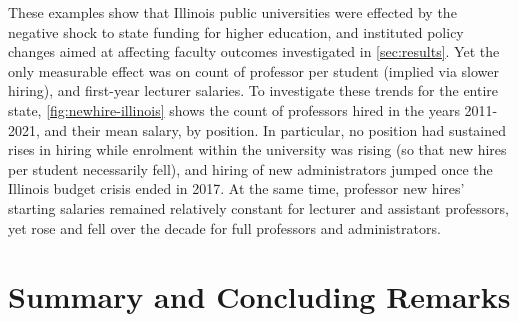 \documentclass[notitlepage,12pt]{article}
\begin{document}
These examples show that Illinois public universities were effected by the negative shock to state funding for higher education, and instituted policy changes aimed at affecting faculty outcomes investigated in \autoref{sec:results}.
Yet the only measurable effect was on count of professor per student (implied via slower hiring), and first-year lecturer salaries.
To investigate these trends for the entire state, \autoref{fig:newhire-illinois} shows the count of professors hired in the years 2011-2021, and their mean salary, by position.
In particular, no position had sustained rises in hiring while enrolment within the university was rising (so that new hires per student necessarily fell), and hiring of new administrators jumped once the Illinois budget crisis ended in 2017.
At the same time, professor new hires' starting salaries remained relatively constant for lecturer and assistant professors, yet rose and fell over the decade for full professors and administrators.

%

%


\section{Summary and Concluding Remarks}
\label{sec:conclusion}
\end{document}
